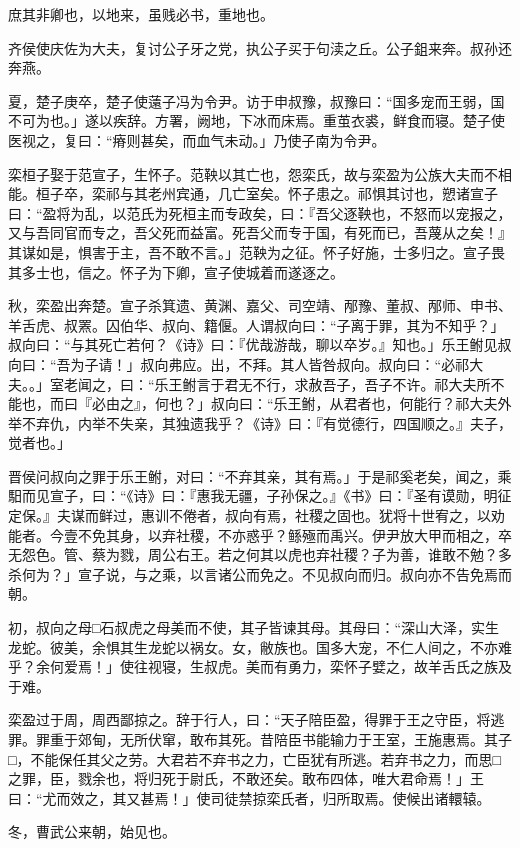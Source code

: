 \documentclass[]{article}
\begin{document}
庶其非卿也，以地来，虽贱必书，重地也。

齐侯使庆佐为大夫，复讨公子牙之党，执公子买于句渎之丘。公子鉏来奔。叔孙还奔燕。

夏，楚子庚卒，楚子使薳子冯为令尹。访于申叔豫，叔豫曰：``国多宠而王弱，国不可为也。」遂以疾辞。方署，阙地，下冰而床焉。重茧衣裘，鲜食而寝。楚子使医视之，复曰：``瘠则甚矣，而血气未动。」乃使子南为令尹。

栾桓子娶于范宣子，生怀子。范鞅以其亡也，怨栾氏，故与栾盈为公族大夫而不相能。桓子卒，栾祁与其老州宾通，几亡室矣。怀子患之。祁惧其讨也，愬诸宣子曰：``盈将为乱，以范氏为死桓主而专政矣，曰：『吾父逐鞅也，不怒而以宠报之，又与吾同官而专之，吾父死而益富。死吾父而专于国，有死而已，吾蔑从之矣！』其谋如是，惧害于主，吾不敢不言。」范鞅为之征。怀子好施，士多归之。宣子畏其多士也，信之。怀子为下卿，宣子使城着而遂逐之。

秋，栾盈出奔楚。宣子杀箕遗、黄渊、嘉父、司空靖、邴豫、董叔、邴师、申书、羊舌虎、叔罴。囚伯华、叔向、籍偃。人谓叔向曰：``子离于罪，其为不知乎？」叔向曰：``与其死亡若何？《诗》曰：『优哉游哉，聊以卒岁。』知也。」乐王鲋见叔向曰：``吾为子请！」叔向弗应。出，不拜。其人皆咎叔向。叔向曰：``必祁大夫。。」室老闻之，曰：``乐王鲋言于君无不行，求赦吾子，吾子不许。祁大夫所不能也，而曰『必由之』，何也？」叔向曰：``乐王鲋，从君者也，何能行？祁大夫外举不弃仇，内举不失亲，其独遗我乎？《诗》曰：『有觉德行，四国顺之。』夫子，觉者也。」

晋侯问叔向之罪于乐王鲋，对曰：``不弃其亲，其有焉。」于是祁奚老矣，闻之，乘馹而见宣子，曰：``《诗》曰：『惠我无疆，子孙保之。』《书》曰：『圣有谟勋，明征定保。』夫谋而鲜过，惠训不倦者，叔向有焉，社稷之固也。犹将十世宥之，以劝能者。今壹不免其身，以弃社稷，不亦惑乎？鲧殛而禹兴。伊尹放大甲而相之，卒无怨色。管、蔡为戮，周公右王。若之何其以虎也弃社稷？子为善，谁敢不勉？多杀何为？」宣子说，与之乘，以言诸公而免之。不见叔向而归。叔向亦不告免焉而朝。

初，叔向之母□石叔虎之母美而不使，其子皆谏其母。其母曰：``深山大泽，实生龙蛇。彼美，余惧其生龙蛇以祸女。女，敝族也。国多大宠，不仁人间之，不亦难乎？余何爱焉！」使往视寝，生叔虎。美而有勇力，栾怀子嬖之，故羊舌氏之族及于难。

栾盈过于周，周西鄙掠之。辞于行人，曰：``天子陪臣盈，得罪于王之守臣，将逃罪。罪重于郊甸，无所伏窜，敢布其死。昔陪臣书能输力于王室，王施惠焉。其子□，不能保任其父之劳。大君若不弃书之力，亡臣犹有所逃。若弃书之力，而思□之罪，臣，戮余也，将归死于尉氏，不敢还矣。敢布四体，唯大君命焉！」王曰：``尤而效之，其又甚焉！」使司徒禁掠栾氏者，归所取焉。使候出诸轘辕。

冬，曹武公来朝，始见也。
\end{document}
